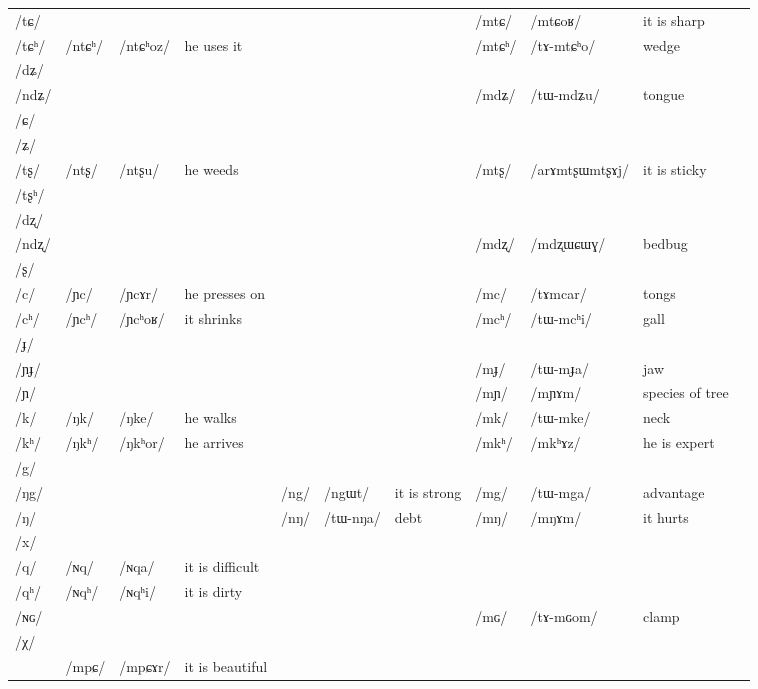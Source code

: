 \documentclass[oldfontcommands,oneside,a4paper,11pt]{article}
\newcommand{\ipa}[1]{/#1/} %
\begin{document}
\begin{table}
{\begin{tabular}{l|lll|lll|lll|l}
\ipa{tɕ}	&	&	&	&	&	&	&	\ipa{mtɕ}	&	\ipa{mtɕoʁ}	&	it is sharp	\\
\ipa{tɕʰ}	&	\ipa{ntɕʰ}	&	\ipa{ntɕʰoz}	&he uses it	&	&	&	&	\ipa{mtɕʰ}	&	\ipa{tɤ-mtɕʰo}	&	wedge	\\
\ipa{dʑ}	&	&	&	&	&	&	&	&	&		\\
\ipa{ndʑ}	&	&	&	&	&	&	&	\ipa{mdʑ}	&	\ipa{tɯ-mdʑu}	&	tongue	\\
\ipa{ɕ}	&	&	&	&	&	&	&	&	&		\\
\ipa{ʑ}	&	&	&	&	&	&	&	&	&		\\
\ipa{tʂ}	&	\ipa{ntʂ}	&	\ipa{ntʂu}	&	he weeds&	&	&	&	\ipa{mtʂ}	&	\ipa{arɤmtʂɯmtʂɤj}	&	it is sticky	\\
\ipa{tʂʰ}	&	&	&	&	&	&	&	&	&		\\
\ipa{dʐ}	&	&	&	&	&	&	&	&	&		\\
\ipa{ndʐ}	&	&	&	&	&	&	&	\ipa{mdʐ}	&	\ipa{mdʐɯɕɯɣ}	&	bedbug	\\
\ipa{ʂ}	&	&	&	&	&	&	&	&	&		\\
\ipa{c}	&	\ipa{ɲc}	&	\ipa{ɲcɤr}	&	he presses on&	&	&	&	\ipa{mc}	&	\ipa{tɤmcar}	&	tongs	\\
\ipa{cʰ}	&	\ipa{ɲcʰ}	&	\ipa{ɲcʰoʁ}	&	it shrinks&	&	&	&	\ipa{mcʰ}	&	\ipa{tɯ-mcʰi}	&	gall	\\
\ipa{ɟ}	&	&	&	&	&	&	&	&	&		\\
\ipa{ɲɟ}	&	&	&	&	&	&	&	\ipa{mɟ}	&	\ipa{tɯ-mɟa}	&	jaw	\\
\ipa{ɲ}	&	&	&	&	&	&	&	\ipa{mɲ}	&	\ipa{mɲɤm}	&	species of tree	\\
\ipa{k}	&	\ipa{ŋk}	&	\ipa{ŋke}	&	he walks&	&	&	&	\ipa{mk}	&	\ipa{tɯ-mke}	&	neck	\\
\ipa{kʰ}	&	\ipa{ŋkʰ}	&	\ipa{ŋkʰor}	&he arrives	&	&	&	&	\ipa{mkʰ}	&	\ipa{mkʰɤz}	&he is expert		\\
\ipa{g}	&	&	&	&	&	&	&	&	&		\\
\ipa{ŋg}	&	&	&	&	\ipa{ng}	&	\ipa{ngɯt}	&it is strong	&	\ipa{mg}	&	\ipa{tɯ-mga}	&	advantage	\\
\ipa{ŋ}	&	&	&	&	\ipa{nŋ}	&	\ipa{tɯ-nŋa}	&	debt&	\ipa{mŋ}	&	\ipa{mŋɤm}	&	it hurts	\\
\ipa{x}	&	&	&	&	&	&	&	&	&		\\
\ipa{q}	&	 	\ipa{ɴq}	&	\ipa{ɴqa}	&	it is difficult&	&		&&&&\\
\ipa{qʰ}	 	&	 	\ipa{ɴqʰ}	&	\ipa{ɴqʰi}	&	it is dirty&	&&	&	&	&\\
\ipa{ɴɢ}	 &	&&&	&	&	&	\ipa{mɢ}	&	\ipa{tɤ-mɢom}	&clamp		\\
\ipa{χ}\\
\midrule
&\ipa{mpɕ} &\ipa{mpɕɤr} & it is beautiful\\
\end{tabular}}
\end{table}
\end{document}
